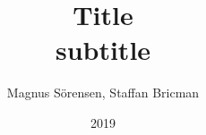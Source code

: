 \documentclass{beamer}
\title{Title\\subtitle}
\author{Magnus Sörensen, Staffan Bricman}
\institute{Märlardalens högskola}
\date{2019}
\begin{document}
\frame{\titlepage}




\end{document}
